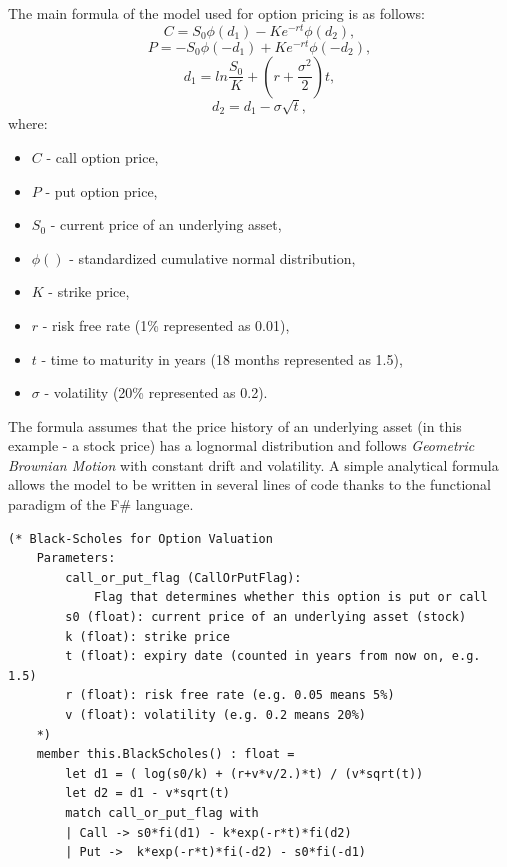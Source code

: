     The main formula of the model used for option pricing is as follows:
    \[
    C = S_0\phi(d_1) - Ke^{-rt}\phi(d_2)
    ,
    \]
    \[
    P = -S_0\phi(-d_1) + Ke^{-rt}\phi(-d_2)
    ,
    \]
    \[
    d_1 = ln\frac{S_0}{K} + (r+\frac{\sigma^2}{2})t
    ,
    \]
    \[
    d_2 = d_1 - \sigma\sqrt{t}
    ,
    \]
    where:
    \begin{itemize}
        \item $C$ - call option price,
        \item $P$ - put option price,
        \item $S_0$ - current price of an underlying asset,
        \item $\phi()$ - standardized cumulative normal distribution,
        \item $K$ - strike price,
        \item $r$ - risk free rate (1\% represented as 0.01),
        \item $t$ - time to maturity in years (18 months represented as 1.5),
        \item $\sigma$ - volatility (20\% represented as 0.2).
    \end{itemize}
    The formula assumes that the price history of an underlying asset (in this example - a stock price) has a lognormal distribution and follows \textit{Geometric Brownian Motion} with constant drift and volatility. 
    A simple analytical formula allows the model to be written in several lines of code thanks to the functional paradigm of the F\# language.
    \begin{lstlisting}[label={lst:bsm}, caption=F\# implementation of \textit{Black--Scholes Model}.]
    (* Black-Scholes for Option Valuation
    Parameters:
        call_or_put_flag (CallOrPutFlag):
            Flag that determines whether this option is put or call
        s0 (float): current price of an underlying asset (stock)
        k (float): strike price
        t (float): expiry date (counted in years from now on, e.g. 1.5)
        r (float): risk free rate (e.g. 0.05 means 5%)
        v (float): volatility (e.g. 0.2 means 20%)
    *)
    member this.BlackScholes() : float =
        let d1 = ( log(s0/k) + (r+v*v/2.)*t) / (v*sqrt(t))
        let d2 = d1 - v*sqrt(t)
        match call_or_put_flag with
        | Call -> s0*fi(d1) - k*exp(-r*t)*fi(d2)
        | Put ->  k*exp(-r*t)*fi(-d2) - s0*fi(-d1)
    \end{lstlisting}
